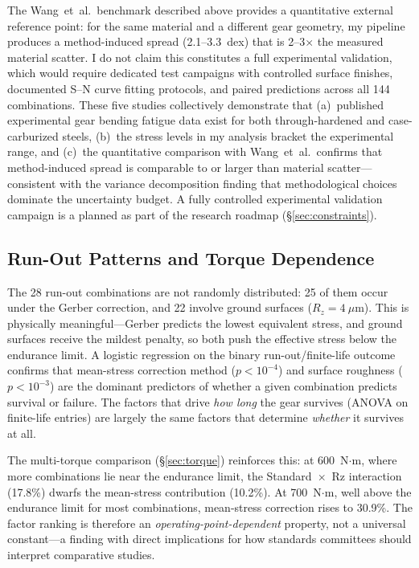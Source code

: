 \documentclass[12pt,a4paper]{article}
\begin{document}
The Wang~et~al.\ benchmark described above provides a quantitative
external reference point: for the same material and a different gear
geometry, my pipeline produces a method-induced spread (2.1--3.3~dex)
that is 2--3$\times$ the measured material scatter. I do not claim
this constitutes a full experimental validation, which would require
dedicated test campaigns with controlled surface finishes, documented
S--N curve fitting protocols, and paired predictions across all 144
combinations. These five studies collectively demonstrate that
(a)~published experimental gear bending fatigue data exist for both
through-hardened and case-carburized steels, (b)~the stress levels in
my analysis bracket the experimental range, and (c)~the quantitative
comparison with Wang~et~al.\ confirms that method-induced spread is
comparable to or larger than material scatter---consistent with the
variance decomposition finding that methodological choices dominate
the uncertainty budget. A fully controlled experimental validation
campaign is a planned as part of the research roadmap (\S\ref{sec:constraints}).

\subsection{Run-Out Patterns and Torque Dependence}

The 28 run-out combinations are not randomly distributed: 25 of them
occur under the Gerber correction, and 22 involve ground surfaces
($R_z = 4~\mu$m). This is physically meaningful---Gerber predicts the
lowest equivalent stress, and ground surfaces receive the mildest
penalty, so both push the effective stress below the endurance limit.
A logistic regression on the binary run-out/finite-life outcome
confirms that mean-stress correction method ($p < 10^{-4}$) and
surface roughness ($p < 10^{-3}$) are the dominant predictors of
whether a given combination predicts survival or failure. The factors
that drive \emph{how long} the gear survives (ANOVA on finite-life
entries) are largely the same factors that determine \emph{whether} it
survives at all.

The multi-torque comparison (\S\ref{sec:torque}) reinforces this:
at 600~N$\cdot$m, where more combinations lie near the endurance
limit, the Standard~$\times$~Rz interaction (17.8\%) dwarfs the
mean-stress contribution (10.2\%). At 700~N$\cdot$m, well above the
endurance limit for most combinations, mean-stress correction rises to
30.9\%. The factor ranking is therefore an \emph{operating-point-dependent}
property, not a universal constant---a finding with direct implications
for how standards committees should interpret comparative studies.
\end{document}
